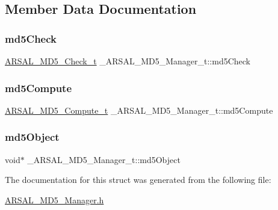 \subsection{Member Data Documentation}
\hypertarget{struct__ARSAL__MD5__Manager__t_a99d59e83379a594ae29d6791a87cf663}{}\label{struct__ARSAL__MD5__Manager__t_a99d59e83379a594ae29d6791a87cf663} 
\subsubsection{\texorpdfstring{md5\+Check}{md5Check}}
{\footnotesize\ttfamily \hyperlink{ARSAL__MD5__Manager_8h_a9d339be5253d570951ae10577a025ffb}{A\+R\+S\+A\+L\+\_\+\+M\+D5\+\_\+\+Check\+\_\+t} \+\_\+\+A\+R\+S\+A\+L\+\_\+\+M\+D5\+\_\+\+Manager\+\_\+t\+::md5\+Check}

\hypertarget{struct__ARSAL__MD5__Manager__t_a11253beda827f985183c1b9bb2cd8cd1}{}\label{struct__ARSAL__MD5__Manager__t_a11253beda827f985183c1b9bb2cd8cd1} 
\subsubsection{\texorpdfstring{md5\+Compute}{md5Compute}}
{\footnotesize\ttfamily \hyperlink{ARSAL__MD5__Manager_8h_a00c03c049421c441ea68281f98638c15}{A\+R\+S\+A\+L\+\_\+\+M\+D5\+\_\+\+Compute\+\_\+t} \+\_\+\+A\+R\+S\+A\+L\+\_\+\+M\+D5\+\_\+\+Manager\+\_\+t\+::md5\+Compute}

\hypertarget{struct__ARSAL__MD5__Manager__t_ac5435ad98781372d4501125712cad2ef}{}\label{struct__ARSAL__MD5__Manager__t_ac5435ad98781372d4501125712cad2ef} 
\subsubsection{\texorpdfstring{md5\+Object}{md5Object}}
{\footnotesize\ttfamily void$\ast$ \+\_\+\+A\+R\+S\+A\+L\+\_\+\+M\+D5\+\_\+\+Manager\+\_\+t\+::md5\+Object}



The documentation for this struct was generated from the following file\+:\begin{DoxyCompactItemize}
\item 
\hyperlink{ARSAL__MD5__Manager_8h}{A\+R\+S\+A\+L\+\_\+\+M\+D5\+\_\+\+Manager.\+h}\end{DoxyCompactItemize}
